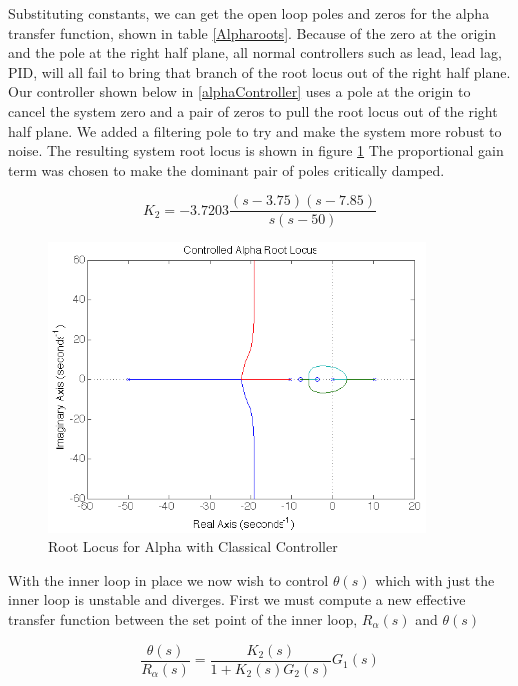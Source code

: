 \documentclass{article}
\theoremstyle{plain}
\theoremstyle{definition}
\theoremstyle{remark}
\begin{document}
Substituting constants, we can get the open loop poles and zeros for the alpha transfer function, shown in table \ref{Alpharoots}. Because of the zero at the origin and the pole at the right half plane, all normal controllers such as lead, lead lag, PID, will all fail to bring that branch of the root locus out of the right half plane.  Our controller shown below in \eqref{alphaController} uses a pole at the origin to cancel the system zero and a pair of zeros to pull the root locus out of the right half plane.  We added a filtering pole to try and make the system more robust to noise.  The resulting system root locus is shown in figure  \ref{q8controlledAlpha}  The proportional gain term was chosen to make the dominant pair of poles critically damped.  

\begin{equation}
K_{2} = -3.7203\frac{(s - 3.75)(s - 7.85)}{s(s-50)} 
\label{alphaController}
\end{equation}

\begin{figure}
\begin{center}
\includegraphics[width = 10cm]{controlledAlpha.png}
\end{center}
\caption{Root Locus for Alpha with Classical Controller}
\label{q8controlledAlpha}
\end{figure}

With the inner loop in place we now wish to control $\theta(s)$ which with just the inner loop is unstable and diverges.  First we must compute a new effective transfer function between the set point of the inner loop, $R_{\alpha}(s)$ and $\theta(s)$

\begin{equation}
\frac{\theta(s)}{R_{\alpha}(s)} = \frac{K_2(s)}{1 + K_2(s) G_2(s)} G_1(s)
\end{equation}
\end{document}
